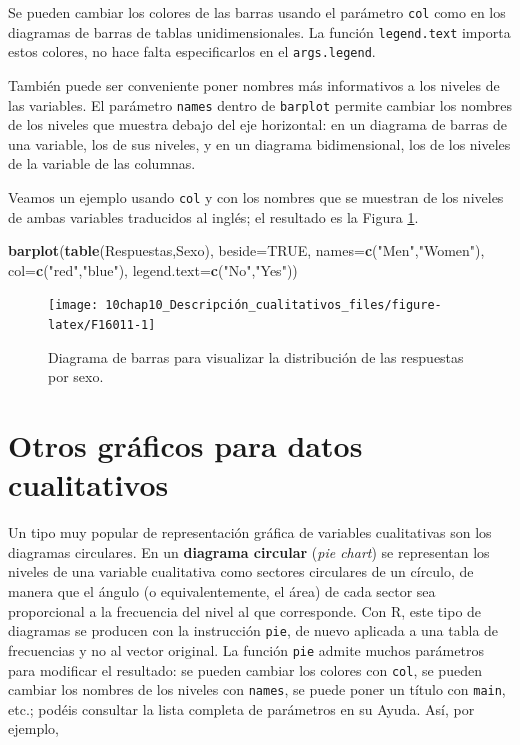 \documentclass[
]{book}
\newenvironment{Shaded}{\begin{snugshade}}{\end{snugshade}}
\newcommand{\DataTypeTok}[1]{\textcolor[rgb]{0.13,0.29,0.53}{#1}}
\newcommand{\KeywordTok}[1]{\textcolor[rgb]{0.13,0.29,0.53}{\textbf{#1}}}
\newcommand{\NormalTok}[1]{#1}
\newcommand{\OtherTok}[1]{\textcolor[rgb]{0.56,0.35,0.01}{#1}}
\newcommand{\StringTok}[1]{\textcolor[rgb]{0.31,0.60,0.02}{#1}}
\theoremstyle{definition}
\theoremstyle{definition}
\theoremstyle{definition}
\theoremstyle{remark}
\begin{document}
Se pueden cambiar los colores de las barras usando el parámetro \texttt{col} como en los diagramas de barras de tablas unidimensionales. La función \texttt{legend.text} importa estos colores, no hace falta especificarlos en el \texttt{args.legend}.

También puede ser conveniente poner nombres más informativos a los niveles de las variables. El parámetro \texttt{names} dentro de \texttt{barplot} permite cambiar los nombres de los niveles que muestra debajo del eje horizontal: en un diagrama de barras de una variable, los de sus niveles, y en un diagrama bidimensional, los de los niveles de la variable de las columnas.

Veamos un ejemplo usando \texttt{col} y con los nombres que se muestran de los niveles de ambas variables traducidos al inglés; el resultado es la Figura \ref{fig:F16011}.

\begin{Shaded}
\begin{Highlighting}[]
\KeywordTok{barplot}\NormalTok{(}\KeywordTok{table}\NormalTok{(Respuestas,Sexo), }\DataTypeTok{beside=}\OtherTok{TRUE}\NormalTok{, }\DataTypeTok{names=}\KeywordTok{c}\NormalTok{(}\StringTok{"Men"}\NormalTok{,}\StringTok{"Women"}\NormalTok{),}
        \DataTypeTok{col=}\KeywordTok{c}\NormalTok{(}\StringTok{"red"}\NormalTok{,}\StringTok{"blue"}\NormalTok{), }\DataTypeTok{legend.text=}\KeywordTok{c}\NormalTok{(}\StringTok{"No"}\NormalTok{,}\StringTok{"Yes"}\NormalTok{))}
\end{Highlighting}
\end{Shaded}

\begin{figure}

{\centering \texttt{[image: 10chap10\_Descripción\_cualitativos\_files/figure-latex/F16011-1]} 

}

\caption{Diagrama de barras para visualizar la distribución de las respuestas por sexo.}\label{fig:F16011}
\end{figure}

\hypertarget{otros-gruxe1ficos-para-datos-cualitativos}{%
\section{Otros gráficos para datos cualitativos}\label{otros-gruxe1ficos-para-datos-cualitativos}}

Un tipo muy popular de representación gráfica de variables cualitativas son los diagramas circulares. En un \textbf{diagrama circular} (\emph{pie chart}) se representan los niveles de una variable cualitativa como sectores circulares de un círculo, de manera que el ángulo (o equivalentemente, el área) de cada sector sea proporcional a la frecuencia del nivel al que corresponde. Con R, este tipo de diagramas se producen con la instrucción \texttt{pie}, de nuevo aplicada a una tabla de frecuencias y no al vector original. La función \texttt{pie} admite muchos parámetros para modificar el resultado: se pueden cambiar los colores con \texttt{col}, se pueden cambiar los nombres de los niveles con \texttt{names}, se puede poner un título con \texttt{main}, etc.;
podéis consultar la lista completa de parámetros en su Ayuda.
Así, por ejemplo,
\end{document}
